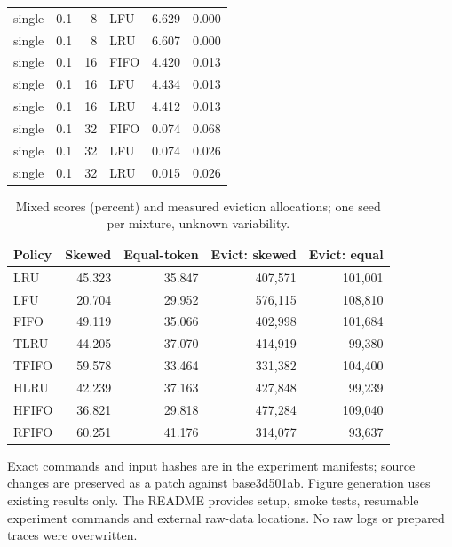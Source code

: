 \documentclass{article}
\begin{document}
\begin{table}[t]
\begin{tabular}{lrrlrr}
single & 0.1 & 8 & LFU & 6.629 & 0.000\\
single & 0.1 & 8 & LRU & 6.607 & 0.000\\
single & 0.1 & 16 & FIFO & 4.420 & 0.013\\
single & 0.1 & 16 & LFU & 4.434 & 0.013\\
single & 0.1 & 16 & LRU & 4.412 & 0.013\\
single & 0.1 & 32 & FIFO & 0.074 & 0.068\\
single & 0.1 & 32 & LFU & 0.074 & 0.026\\
single & 0.1 & 32 & LRU & 0.015 & 0.026\\
\bottomrule\end{tabular}\end{table}
\begin{table}[t]\centering\small\caption{Mixed scores (percent) and measured eviction allocations; one seed per mixture, unknown variability.}
\begin{tabular}{lrrrr}\toprule Policy & Skewed & Equal-token & Evict: skewed & Evict: equal\\\midrule
LRU & 45.323 & 35.847 & 407,571 & 101,001\\
LFU & 20.704 & 29.952 & 576,115 & 108,810\\
FIFO & 49.119 & 35.066 & 402,998 & 101,684\\
TLRU & 44.205 & 37.070 & 414,919 & 99,380\\
TFIFO & 59.578 & 33.464 & 331,382 & 104,400\\
HLRU & 42.239 & 37.163 & 427,848 & 99,239\\
HFIFO & 36.821 & 29.818 & 477,284 & 109,040\\
RFIFO & 60.251 & 41.176 & 314,077 & 93,637\\
\bottomrule\end{tabular}\end{table}
Exact commands and input hashes are in the experiment manifests; source changes are preserved as a patch against base3d501ab. Figure generation uses existing results only. The README provides setup, smoke tests, resumable experiment commands and external raw-data locations. No raw logs or prepared traces were overwritten.
\end{document}
